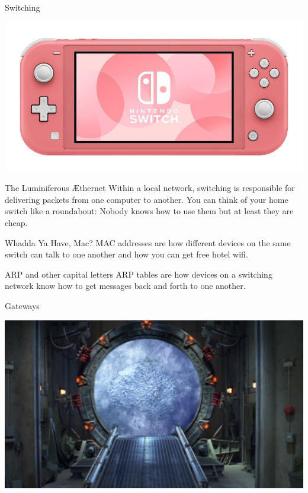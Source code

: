\documentclass[presentation]{beamer}
\begin{document}
\begin{frame}[label={sec:org9efa657}]{Switching}
\begin{center}
\includegraphics[width=.9\linewidth]{./switch.jpeg}
\end{center}
\end{frame}

\begin{frame}[label={sec:org92ea1e3}]{The Luminiferous Æthernet}
Within a local network, switching is responsible for delivering
packets from one computer to another. You can think of your home
switch like a roundabout: Nobody knows how to use them but at least
they are cheap.
\end{frame}

\begin{frame}[label={sec:orgde33ffe}]{Whadda Ya Have, Mac?}
MAC addresses are how different devices on the same switch can talk to
one another and how you can get free hotel wifi.
\end{frame}

\begin{frame}[label={sec:orge000fb3}]{ARP and other capital letters}
ARP tables are how devices on a switching network know how to get
messages back and forth to one another.
\end{frame}

\begin{frame}[label={sec:orgd414903}]{Gateways}
\begin{center}
\includegraphics[width=.9\linewidth]{./stargate.jpg}
\end{center}
\end{frame}
\end{document}
